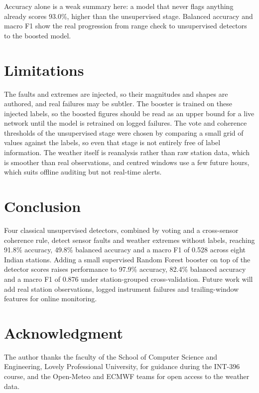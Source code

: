 \documentclass[conference]{IEEEtran}
\begin{document}
Accuracy alone is a weak summary here: a model that never flags anything already scores 93.0\%,
higher than the unsupervised stage. Balanced accuracy and macro F1 show the real progression from
range check to unsupervised detectors to the boosted model.

\section{Limitations}
The faults and extremes are injected, so their magnitudes and shapes are authored, and real failures
may be subtler. The booster is trained on these injected labels, so the boosted figures should be
read as an upper bound for a live network until the model is retrained on logged failures. The vote
and coherence thresholds of the unsupervised stage were chosen by comparing a small grid of values
against the labels, so even that stage is not entirely free of label information. The weather itself
is reanalysis rather than raw station data, which is smoother than real observations, and centred
windows use a few future hours, which suits offline auditing but not real-time alerts.

\section{Conclusion}
Four classical unsupervised detectors, combined by voting and a cross-sensor coherence rule, detect
sensor faults and weather extremes without labels, reaching 91.8\% accuracy, 49.8\% balanced
accuracy and a macro F1 of 0.528 across eight Indian stations. Adding a small supervised Random
Forest booster on top of the detector scores raises performance to 97.9\% accuracy, 82.4\% balanced
accuracy and a macro F1 of 0.876 under station-grouped cross-validation. Future work will add real
station observations, logged instrument failures and trailing-window features for online
monitoring.

\section*{Acknowledgment}
The author thanks the faculty of the School of Computer Science and Engineering, Lovely Professional
University, for guidance during the INT-396 course, and the Open-Meteo and ECMWF teams for open
access to the weather data.
\end{document}
